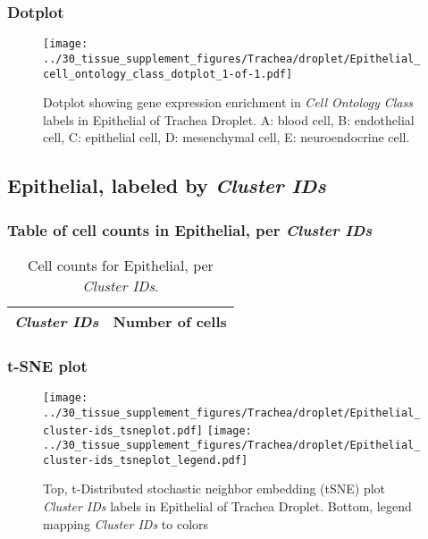 \clearpage

\subsubsection{Dotplot}
\begin{figure}[h]
\centering
\texttt{[image: ../30\_tissue\_supplement\_figures/Trachea/droplet/Epithelial\_cell\_ontology\_class\_dotplot\_1-of-1.pdf]}

\caption{ Dotplot  showing gene expression enrichment in \emph{Cell Ontology Class} labels in Epithelial of Trachea Droplet. A: blood cell, B: endothelial cell, C: epithelial cell, D: mesenchymal cell, E: neuroendocrine cell.}
\end{figure}


\clearpage

\subsection{Epithelial, labeled by \emph{Cluster IDs}}
\subsubsection{Table of cell counts in Epithelial, per \emph{Cluster IDs}}\begin{table}[h]
\centering
\label{my-label}
\begin{tabular}{@{}ll@{}}
\toprule

\emph{Cluster IDs}& Number of cells \\ \midrule\bottomrule
\end{tabular}
\caption{Cell counts for Epithelial, per \emph{Cluster IDs}.}
\end{table}

\clearpage
\subsubsection{t-SNE plot}
\begin{figure}[h]
\centering
\texttt{[image: ../30\_tissue\_supplement\_figures/Trachea/droplet/Epithelial\_cluster-ids\_tsneplot.pdf]}
\texttt{[image: ../30\_tissue\_supplement\_figures/Trachea/droplet/Epithelial\_cluster-ids\_tsneplot\_legend.pdf]}
\caption{Top, t-Distributed stochastic neighbor embedding (tSNE) plot  \emph{Cluster IDs} labels in Epithelial of Trachea Droplet. Bottom, legend mapping \emph{Cluster IDs} to colors}
\end{figure}


